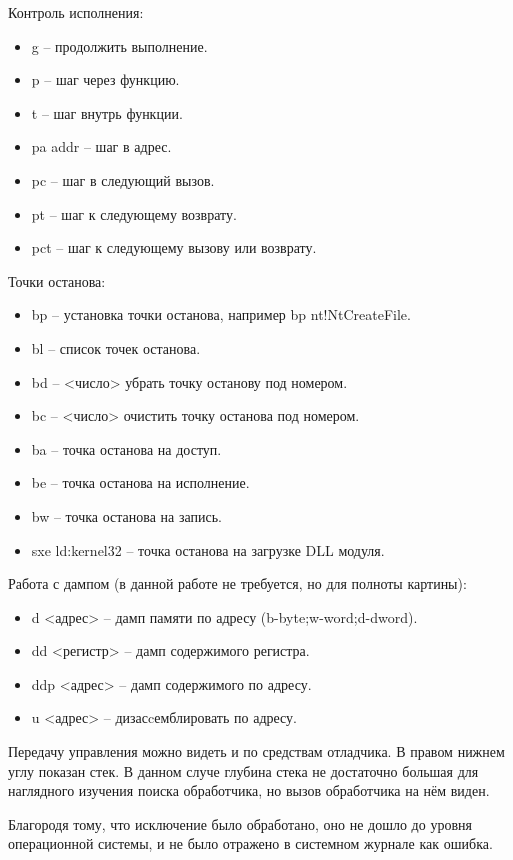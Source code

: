 \documentclass[a4paper, 12pt]{report}		%
\begin{document}
Контроль исполнения:
\begin{itemize}
\item g -- продолжить выполнение.
\item p -- шаг через функцию.
\item t -- шаг внутрь функции.
\item pa addr -- шаг в адрес.
\item pc -- шаг в следующий вызов.
\item pt -- шаг к следующему возврату.
\item pct -- шаг к следующему вызову или возврату.
\end{itemize}

Точки останова:
\begin{itemize}
\item bp -- установка точки останова, например bp nt!NtCreateFile.
\item bl -- список точек останова.
\item bd -- <число> убрать точку останову под номером.
\item bc -- <число> очистить точку останова под номером.
\item ba -- точка останова на доступ.
\item be -- точка останова на исполнение.
\item bw -- точка останова на запись.
\item sxe ld:kernel32 -- точка останова на загрузке DLL модуля.
\end{itemize}

Работа с дампом (в данной работе не требуется, но для полноты картины):
\begin{itemize}
\item d <адрес> -- дамп памяти по адресу (b-byte;w-word;d-dword).
\item dd <регистр> -- дамп содержимого регистра.
\item ddp <адрес> -- дамп содержимого по адресу.
\item u <адрес> -- дизасcемблировать по адресу.
\end{itemize}

Передачу управления можно видеть и по средствам отладчика. В правом нижнем углу показан стек. В данном случе глубина стека не достаточно большая для наглядного изучения поиска обработчика, но вызов обработчика на нём виден.

Благородя тому, что исключение было обработано, оно не дошло до уровня операционной системы, и не было отражено в системном журнале как ошибка.
\end{document}
